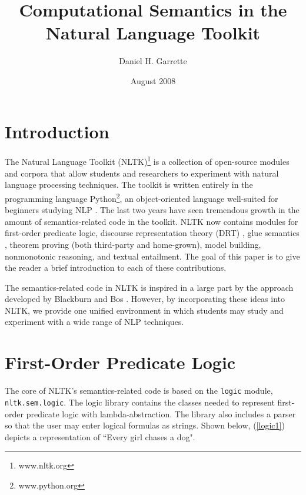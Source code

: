 \documentclass{article}
\newcommand{\dhgcode}[1]{{\tt #1}}
\begin{document}
\title{Computational Semantics in the Natural Language Toolkit}
\author{Daniel H. Garrette}
\date{August 2008}
\maketitle

\begin{abstract}

\end{abstract}

\section{Introduction}
The Natural Language Toolkit (NLTK)\footnote{www.nltk.org} is a collection of open-source modules and corpora that allow students and researchers to experiment with natural language processing techniques.  The toolkit is written entirely in the programming language Python\footnote{www.python.org}, an object-oriented language well-suited for beginners studying NLP \cite{Multidisciplinary}.  The last two years have seen tremendous growth in the amount of semantics-related code in the toolkit.  NLTK now contains modules for first-order predicate logic, discourse representation theory (DRT) \cite{KampReyle}, glue semantics \cite{Dalrymple2001}, theorem proving (both third-party and home-grown), model building, nonmonotonic reasoning, and textual entailment.  The goal of this paper is to give the reader a brief introduction to each of these contributions.

The semantics-related code in NLTK is inspired in a large part by the approach developed by Blackburn and Bos \cite{BB}.  However, by incorporating these ideas into NLTK, we provide one unified environment in which students may study and experiment with a wide range of NLP techniques.

\section{First-Order Predicate Logic}
The core of NLTK's semantics-related code is based on the \dhgcode{logic} module, \dhgcode{nltk.sem.logic}.  The logic library contains the classes needed to represent first-order predicate logic with lambda-abstraction.  The library also includes a parser so that the user may enter logical formulas as strings.  Shown below, (\ref{logic1}) depicts a representation of ``Every girl chases a dog".  

\enumsentence{\label{logic1}\dhgcode{all x.(girl(x) -$>$ exists y.(dog(x) \& chase(x,y)))}}
\end{document}
